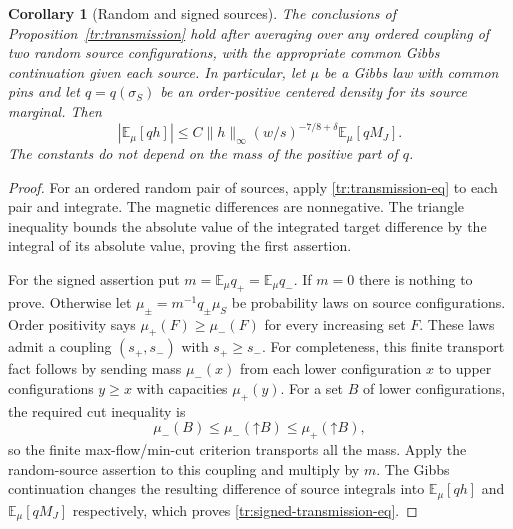 \documentclass[11pt]{article}
\newtheorem{corollary}[theorem]{Corollary}
\theoremstyle{definition}
\theoremstyle{remark}
\numberwithin{equation}{section}
\begin{document}
\begin{corollary}[Random and signed sources]
\label{tr:signed-transmission}
The conclusions of Proposition~\ref{tr:transmission} hold after averaging
over any ordered coupling of two random source configurations, with the
appropriate common Gibbs continuation given each source. In particular,
let $\mu$ be a Gibbs law with common pins and let $q=q(\sigma_S)$ be an
order-positive centered density for its source marginal. Then
\begin{equation}
\label{tr:signed-transmission-eq}
 \left|\mathbb E_\mu[qh]\right|
 \leq C\|h\|_\infty(w/s)^{-7/8+\delta}
                    \mathbb E_\mu[qM_J].
\end{equation}
The constants do not depend on the mass of the positive part of $q$.
\end{corollary}

\begin{proof}
For an ordered random pair of sources, apply
\eqref{tr:transmission-eq} to each pair and integrate. The magnetic
differences are nonnegative. The triangle inequality bounds the absolute
value of the integrated target difference by the integral of its absolute
value, proving the first assertion.

For the signed assertion put $m=\mathbb E_\mu q_+=\mathbb E_\mu q_-$.
If $m=0$ there is nothing to prove. Otherwise let
$\mu_\pm=m^{-1}q_\pm\mu_S$ be probability laws on source configurations.
Order positivity says $\mu_+(F)\geq\mu_-(F)$ for every increasing set $F$.
These laws admit a coupling $(s_+,s_-)$ with $s_+\geq s_-$. For
completeness, this finite transport fact follows by sending mass
$\mu_-(x)$ from each lower configuration $x$ to upper configurations
$y\geq x$ with capacities $\mu_+(y)$. For a set $B$ of lower
configurations, the required cut inequality is
\[
 \mu_-(B)\leq\mu_-(\mathord\uparrow B)
             \leq\mu_+(\mathord\uparrow B),
\]
so the finite max-flow/min-cut criterion transports all the mass.
Apply the random-source assertion to this coupling and multiply by $m$.
The Gibbs continuation changes the resulting difference of source
integrals into $\mathbb E_\mu[qh]$ and $\mathbb E_\mu[qM_J]$ respectively,
which proves \eqref{tr:signed-transmission-eq}.
\end{proof}
\end{document}

